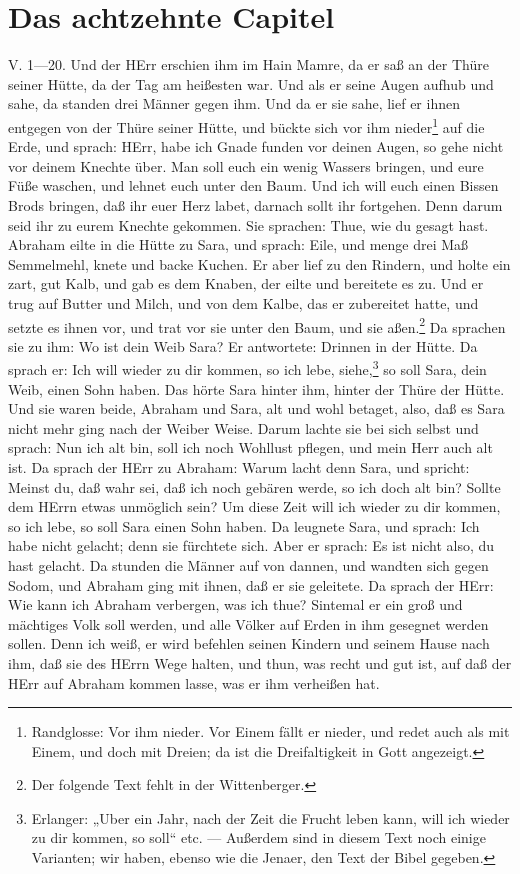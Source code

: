 \section{Das achtzehnte Capitel}

\begin{schriftzitat}
V. 1—20. Und der HErr erschien ihm im Hain Mamre, da er saß an der Thüre seiner Hütte, da der Tag am heißesten war. Und als er seine Augen aufhub und sahe, da standen drei Männer gegen ihm. Und da er sie sahe, lief er ihnen entgegen von der Thüre seiner Hütte, und bückte sich vor ihm nieder\footnote{Randglosse: Vor ihm nieder. Vor Einem fällt er nieder, und redet auch als mit Einem, und doch mit Dreien; da ist die Dreifaltigkeit in Gott angezeigt.} auf die Erde, und sprach: HErr, habe ich Gnade funden vor deinen Augen, so gehe nicht vor deinem Knechte über. Man soll euch ein wenig Wassers bringen, und eure Füße waschen, und lehnet euch unter den Baum. Und ich will euch einen Bissen Brods bringen, daß ihr euer Herz labet, darnach sollt ihr fortgehen. Denn darum seid ihr zu eurem Knechte gekommen. Sie sprachen: Thue, wie du gesagt hast. Abraham eilte in die Hütte zu Sara, und sprach: Eile, und menge drei Maß Semmelmehl, knete und backe Kuchen. Er aber lief zu den Rindern, und holte ein zart, gut Kalb, und gab es dem Knaben, der eilte und bereitete es zu. Und er trug auf Butter und Milch, und von dem Kalbe, das er zubereitet hatte, und setzte es ihnen vor, und trat vor sie unter den Baum, und sie aßen.\footnote{Der folgende Text fehlt in der Wittenberger.} Da sprachen sie zu ihm: Wo ist dein Weib Sara? Er antwortete: Drinnen in der Hütte. Da sprach er: Ich will wieder zu dir kommen, so ich lebe, siehe,\footnote{Erlanger: „Uber ein Jahr, nach der Zeit die Frucht leben kann, will ich wieder zu dir kommen, so soll“ etc. — Außerdem sind in diesem Text noch einige Varianten; wir haben, ebenso wie die Jenaer, den Text der Bibel gegeben.} so soll Sara, dein Weib, einen Sohn haben. Das hörte Sara hinter ihm, hinter der Thüre der Hütte. Und sie waren beide, Abraham und Sara, alt und wohl betaget, also, daß es Sara nicht mehr ging nach
der Weiber Weise. Darum lachte sie bei sich selbst und sprach: Nun ich alt bin, soll ich noch Wohllust pflegen, und mein Herr auch alt ist. Da sprach der HErr zu Abraham: Warum lacht denn Sara, und spricht: Meinst du, daß wahr sei, daß ich noch gebären werde, so ich doch alt bin? Sollte dem HErrn etwas unmöglich sein? Um diese Zeit will ich wieder zu dir kommen, so ich lebe, so soll Sara einen Sohn haben. Da leugnete Sara, und sprach: Ich habe nicht gelacht; denn sie fürchtete sich. Aber er sprach: Es ist nicht also, du hast gelacht. Da stunden die Männer auf von dannen, und wandten sich gegen Sodom, und Abraham ging mit ihnen, daß er sie geleitete. Da sprach der HErr: Wie kann ich Abraham verbergen, was ich thue? Sintemal er ein groß und mächtiges Volk soll werden, und alle Völker auf Erden in ihm gesegnet werden sollen. Denn ich weiß, er wird befehlen seinen Kindern und seinem Hause nach ihm, daß sie des HErrn Wege halten, und thun, was recht und gut ist, auf daß der HErr auf Abraham kommen lasse, was er ihm verheißen hat.
\end{schriftzitat}

